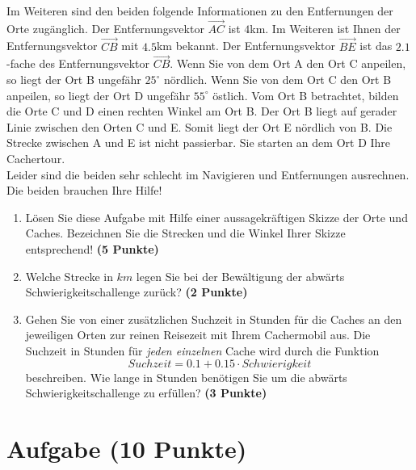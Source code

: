\documentclass[a4paper, 9pt]{scrartcl}\usepackage[]{graphicx}\usepackage[]{xcolor}
\begin{document}
Im Weiteren sind den beiden folgende Informationen zu den Entfernungen der Orte zugänglich. Der Entfernungsvektor $\overrightarrow{AC}$ ist $4$km. Im Weiteren ist Ihnen der Entfernungsvektor $\overrightarrow{CB}$ mit $4.5$km bekannt. Der Entfernungsvektor $\overrightarrow{BE}$ ist das $2.1$-fache des Entfernungsvektor $\overrightarrow{CB}$. Wenn Sie von dem Ort A den Ort C anpeilen, so liegt der Ort B ungefähr $25^\circ$ nördlich. Wenn Sie von dem Ort C den Ort B anpeilen, so liegt der Ort D ungefähr $55^\circ$ östlich. Vom Ort B betrachtet, bilden die Orte C und D einen rechten Winkel am Ort B. Der Ort B liegt auf gerader Linie zwischen den Orten C und E. Somit liegt der Ort E nördlich von B. Die Strecke zwischen A und E ist nicht passierbar. Sie starten an dem Ort D Ihre Cachertour. \\

Leider sind die beiden sehr schlecht im Navigieren und Entfernungen ausrechnen. Die beiden brauchen Ihre Hilfe!
  
\begin{enumerate}
\item Lösen Sie diese Aufgabe mit Hilfe einer aussagekräftigen Skizze der Orte und Caches. Bezeichnen Sie die Strecken und die Winkel Ihrer Skizze entsprechend! \textbf{(5 Punkte)}
\item Welche Strecke in $km$ legen Sie bei der Bewältigung der abwärts Schwierigkeitschallenge zurück? \textbf{(2 Punkte)}
\item Gehen Sie von einer zusätzlichen Suchzeit in Stunden für die Caches an den jeweiligen Orten zur reinen Reisezeit mit Ihrem Cachermobil aus. Die Suchzeit in Stunden für \textit{jeden einzelnen} Cache wird durch die Funktion  
  \begin{equation*}
    Suchzeit = 0.1 + 0.15 \cdot Schwierigkeit
  \end{equation*}  
  beschreiben.  Wie lange in Stunden benötigen Sie um die abwärts Schwierigkeitschallenge zu erfüllen? \textbf{(3 Punkte)}
\end{enumerate}

 
\clearpage

\section{Aufgabe \hfill (10 Punkte)}
\end{document}
